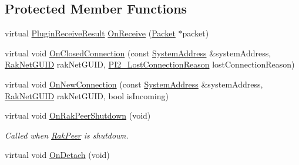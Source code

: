 \subsection*{Protected Member Functions}
\begin{DoxyCompactItemize}
\item 
virtual \hyperlink{group___p_l_u_g_i_n___i_n_t_e_r_f_a_c_e___g_r_o_u_p_ga89998adaafb29e5d879113b992161085}{Plugin\-Receive\-Result} \hyperlink{class_rak_net_1_1_replica_manager3_a0cdd79247e16ca120ed9d13c1fca60ed}{On\-Receive} (\hyperlink{struct_rak_net_1_1_packet}{Packet} $\ast$packet)
\item 
virtual void \hyperlink{class_rak_net_1_1_replica_manager3_abebbd0c277164e36dd342b1f83492427}{On\-Closed\-Connection} (const \hyperlink{struct_rak_net_1_1_system_address}{System\-Address} \&system\-Address, \hyperlink{struct_rak_net_1_1_rak_net_g_u_i_d}{Rak\-Net\-G\-U\-I\-D} rak\-Net\-G\-U\-I\-D, \hyperlink{group___p_l_u_g_i_n___i_n_t_e_r_f_a_c_e___g_r_o_u_p_ga376cc546fd6892c2ead48cd51796c8b8}{P\-I2\-\_\-\-Lost\-Connection\-Reason} lost\-Connection\-Reason)
\item 
virtual void \hyperlink{class_rak_net_1_1_replica_manager3_ac0c9ec75335ffe5f117a99ee24b55310}{On\-New\-Connection} (const \hyperlink{struct_rak_net_1_1_system_address}{System\-Address} \&system\-Address, \hyperlink{struct_rak_net_1_1_rak_net_g_u_i_d}{Rak\-Net\-G\-U\-I\-D} rak\-Net\-G\-U\-I\-D, bool is\-Incoming)
\item 
\hypertarget{class_rak_net_1_1_replica_manager3_ad812ceecfe3150b78236382d7a6a2784}{virtual void \hyperlink{class_rak_net_1_1_replica_manager3_ad812ceecfe3150b78236382d7a6a2784}{On\-Rak\-Peer\-Shutdown} (void)}\label{class_rak_net_1_1_replica_manager3_ad812ceecfe3150b78236382d7a6a2784}

\begin{DoxyCompactList}\small\item\em Called when \hyperlink{class_rak_net_1_1_rak_peer}{Rak\-Peer} is shutdown. \end{DoxyCompactList}\item 
\hypertarget{class_rak_net_1_1_replica_manager3_af2251f16c8f5146cdfe8b927543177ee}{virtual void \hyperlink{class_rak_net_1_1_replica_manager3_af2251f16c8f5146cdfe8b927543177ee}{On\-Detach} (void)}\label{class_rak_net_1_1_replica_manager3_af2251f16c8f5146cdfe8b927543177ee}


\end{DoxyCompactItemize}
